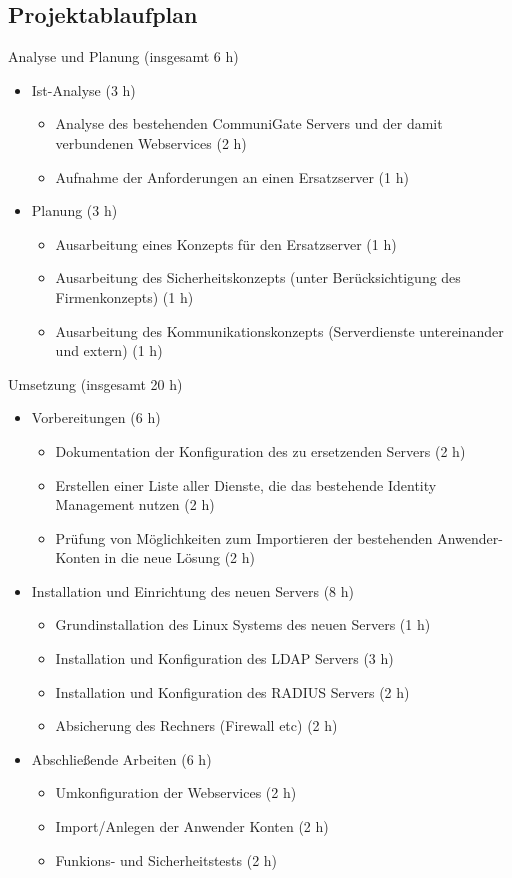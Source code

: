 \documentclass[11pt,a4paper,titlepage=firstiscover]{scrartcl} %
\begin{document}
\subsection{Projektablaufplan}
Analyse und Planung (insgesamt 6 h)
\begin{itemize}
\item Ist-Analyse (3 h)
\begin{itemize}
\item Analyse des bestehenden CommuniGate Servers und der damit verbundenen Webservices (2 h)
\item Aufnahme der Anforderungen an einen Ersatzserver (1 h)
\end{itemize}
\item Planung (3 h)
\begin{itemize}
\item Ausarbeitung eines Konzepts für den Ersatzserver (1 h)
\item Ausarbeitung des Sicherheitskonzepts (unter Berücksichtigung des Firmenkonzepts) (1 h)
\item Ausarbeitung des Kommunikationskonzepts (Serverdienste untereinander und extern) (1 h)
\end{itemize}
\end{itemize}
Umsetzung (insgesamt 20 h)
\begin{itemize}
\item Vorbereitungen (6 h)
\begin{itemize}
\item Dokumentation der Konfiguration des zu ersetzenden Servers (2 h)
\item Erstellen einer Liste aller Dienste, die das bestehende Identity Management nutzen (2 h)
\item Prüfung von Möglichkeiten zum Importieren der bestehenden Anwender-Konten in die neue Lösung (2 h)
\end{itemize}
\item Installation und Einrichtung des neuen Servers (8 h)
\begin{itemize}
\item Grundinstallation des Linux Systems des neuen Servers (1 h)
\item Installation und Konfiguration des LDAP Servers (3 h)
\item Installation und Konfiguration des RADIUS Servers (2 h)
\item Absicherung des Rechners (Firewall etc) (2 h)
\end{itemize}
\item Abschließende Arbeiten (6 h)
\begin{itemize}
\item Umkonfiguration der Webservices (2 h)
\item Import/Anlegen der Anwender Konten (2 h)
\item Funkions- und Sicherheitstests (2 h)
\end{itemize}
\end{itemize}
\end{document}
